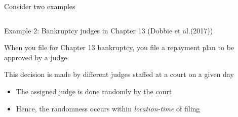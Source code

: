 \documentclass[notes,11pt, aspectratio=169]{beamer}
\newenvironment{wideitemize}{\itemize\addtolength{\itemsep}{10pt}}{\enditemize}
\begin{document}
\begin{frame}{Consider two examples}
  \begin{columns}[onlytextwidth, T] %
    \begin{column}{.50\textwidth}
      \begin{wideitemize}
      \item Example 2: Bankruptcy judges in Chapter 13 (Dobbie et al.(2017))
      \item When you file for Chapter 13 bankruptcy, you file a
        repayment plan to be approved by a judge
      \item This decision is made by different judges staffed at a
        court on a given day
        \begin{itemize}
        \item The assigned judge is done randomly by the court
        \item Hence, the randomness occurs within \emph{location-time}
          of filing
        \end{itemize}
      \end{wideitemize}
    \end{column}%
    \hfill%
    \begin{column}{.5\textwidth}
    \end{column}%
  \end{columns}
\end{frame}
\end{document}
